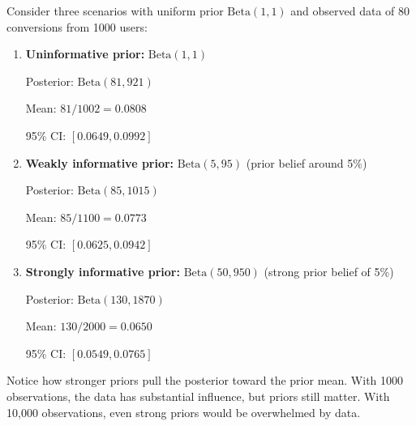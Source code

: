 \begin{example}
Consider three scenarios with uniform prior $\text{Beta}(1,1)$ and observed data of 80 conversions from 1000 users:

\begin{enumerate}
    \item \textbf{Uninformative prior:} $\text{Beta}(1, 1)$

    Posterior: $\text{Beta}(81, 921)$

    Mean: $81/1002 = 0.0808$

    95\% CI: $[0.0649, 0.0992]$

    \item \textbf{Weakly informative prior:} $\text{Beta}(5, 95)$ (prior belief around 5\%)

    Posterior: $\text{Beta}(85, 1015)$

    Mean: $85/1100 = 0.0773$

    95\% CI: $[0.0625, 0.0942]$

    \item \textbf{Strongly informative prior:} $\text{Beta}(50, 950)$ (strong prior belief of 5\%)

    Posterior: $\text{Beta}(130, 1870)$

    Mean: $130/2000 = 0.0650$

    95\% CI: $[0.0549, 0.0765]$
\end{enumerate}

Notice how stronger priors pull the posterior toward the prior mean. With 1000 observations, the data has substantial influence, but priors still matter. With 10,000 observations, even strong priors would be overwhelmed by data.
\end{example}

